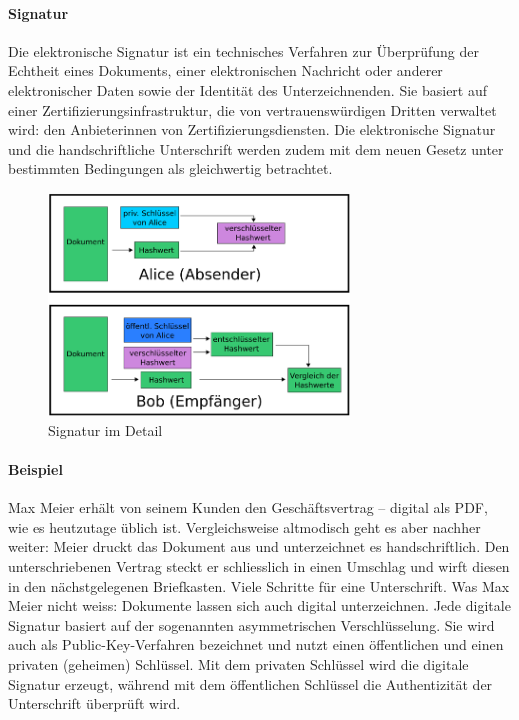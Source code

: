 \documentclass[10pt,a4paper]{article}
\begin{document}
\paragraph*{Signatur}Die elektronische Signatur ist ein technisches Verfahren zur Überprüfung der Echtheit eines Dokuments, einer elektronischen Nachricht oder anderer elektronischer Daten sowie der Identität des Unterzeichnenden. Sie basiert auf einer Zertifizierungsinfrastruktur, die von vertrauenswürdigen Dritten verwaltet wird: den Anbieterinnen von Zertifizierungsdiensten. Die elektronische Signatur und die handschriftliche Unterschrift werden zudem mit dem neuen Gesetz unter bestimmten Bedingungen als gleichwertig betrachtet.
\begin{figure}[H]
    \begin{center}
    \includegraphics[width=8cm]{images/digisignatur1.png}
    \caption{Signatur im Detail}
    \label{digisig1}
    \end{center}
\end{figure}

\paragraph*{Beispiel}Max Meier erhält von seinem Kunden den Geschäftsvertrag – digital als PDF, wie es heutzutage üblich ist. Vergleichsweise altmodisch geht es aber nachher weiter: Meier druckt das Dokument aus und unterzeichnet es handschriftlich. Den unterschriebenen Vertrag steckt er schliesslich in einen Umschlag und wirft diesen in den nächstgelegenen Briefkasten. Viele Schritte für eine Unterschrift. Was Max Meier nicht weiss: Dokumente lassen sich auch digital unterzeichnen. Jede digitale Signatur basiert auf der sogenannten asymmetrischen Verschlüsselung. Sie wird auch als Public-Key-Verfahren bezeichnet und nutzt einen öffentlichen und einen privaten (geheimen) Schlüssel. Mit dem privaten Schlüssel wird die digitale Signatur erzeugt, während mit dem öffentlichen Schlüssel die Authentizität der Unterschrift überprüft wird.
\end{document}
